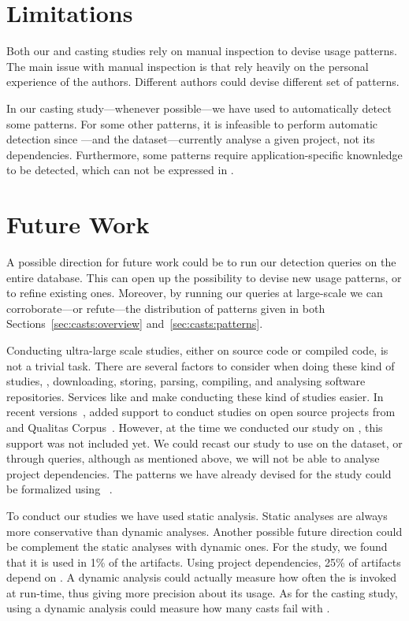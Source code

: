 \section{Limitations}

Both our \unsafe{} and casting studies rely on manual inspection to devise usage patterns.
The main issue with manual inspection is that rely heavily on the personal experience of the authors.
Different authors could devise different set of patterns.

In our casting study---whenever possible---we have used \ql{} to automatically detect some patterns.
For some other patterns, it is infeasible to perform automatic detection since \ql{}---and the \lgtm{} dataset---currently analyse a given project,
not its dependencies.
Furthermore, some patterns require application-specific knownledge to be detected,
which can not be expressed in \ql{}.


\section{Future Work}

A possible direction for future work could be to run our detection queries on the entire \lgtm{} database.
This can open up the possibility to devise new usage patterns,
or to refine existing ones.
Moreover,
by running our queries at large-scale we can corroborate---or refute---the distribution of patterns given in both Sections~\ref{sec:casts:overview} and~\ref{sec:casts:patterns}.

Conducting ultra-large scale studies, either on source code or compiled code, is not a trivial task.
There are several factors to consider when doing these kind of studies,
\eg{}, downloading, storing, parsing, compiling,
and analysing software repositories.
Services like \boa{} and \lgtm{} make conducting these kind of studies easier.
In recent versions~\citep{boa-github},
\boa{} added support to conduct studies on open source projects from \github{} and Qualitas Corpus~\citep{temperoQualitasCorpusCurated2010}.
However, at the time we conducted our study on \unsafe{},
this support was not included yet.
We could recast our \unsafe{} study to use \boa{} on the \github{} dataset,
or \lgtm{} through \ql{} queries, although as mentioned above,
we will not be able to analyse project dependencies.
The patterns we have already devised for the \unsafe{} study could be formalized using \ql{}~\citep{avgustinovQLObjectorientedQueries2016}.

To conduct our studies we have used static analysis.
Static analyses are always more conservative than dynamic analyses.
Another possible future direction could be complement the static analyses with dynamic ones.
For the \unsafe{} study,
we found that it is used in 1\% of the \mavencentral{} artifacts.
Using project dependencies, 25\% of artifacts depend on \smu{}.
A dynamic analysis could actually measure how often the \unsafe{} \api{} is invoked at run-time,
thus giving more precision about its usage.
As for the casting study,
using a dynamic analysis could measure how many casts fail with .

